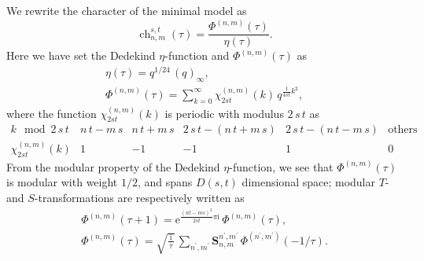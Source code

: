 \documentclass[12pt,reqno]{amsart}
\DeclareMathOperator{\ch}{ch}
\begin{document}
We rewrite the   character of the minimal model as
\begin{equation}
  \ch_{n,m}^{s,t}(\tau)
  =
  \frac{
    \Phi^{(n,m)}(\tau)
  }{\eta(\tau)} .
\end{equation}
Here
we have set the Dedekind $\eta$-function and $\Phi^{(n,m)}(\tau)$ as
\begin{gather}
  \eta(\tau)
  =
  q^{1/24} \, (q)_\infty, 
  \nonumber
  \\[2mm]
%
  \Phi^{(n,m)}(\tau)
  =
  \sum_{k=0}^\infty \chi_{2 s t}^{(n,m)}(k) \, q^{\frac{1}{4 s t} k^2} ,
  \label{define_Phi}
\end{gather}
where the function $\chi_{2 s t}^{(n,m)}(k)$ is periodic with modulus
$2\, s \, t$ as
\begin{equation}
  \begin{array}{c|ccccc}
    k
    \mod 2 \, s \, t
    & n \, t - m \, s & n \, t + m \, s &
    2 \, s \, t - ( n \, t + m \, s)
    & 2 \, s \, t - (n \, t - m \, s) &
    \text{others}
    \\
    \hline
    \chi_{2 s t}^{(n,m)}(k)
    &
    1 & -1 & -1 & 1 & 0
  \end{array}
\end{equation}
{}From the modular property of the Dedekind $\eta$-function,
we see that $\Phi^{(n,m)}(\tau)$ is modular with weight $1/2$, and
spans $D(s,t)$ dimensional space;
modular
$T$- and $S$-transformations are respectively written as
\begin{gather}
  \Phi^{(n,m)}(\tau+1)
  =
  \mathrm{e}^{\frac{(n t - m s)^2}{2 s t} \pi \mathrm{i}} \,
  \Phi^{(n,m)}(\tau) ,
  \\[2mm]
%
  \Phi^{(n,m)}(\tau)
  =
  \sqrt{\frac{\   \mathrm{i}  \  }{\tau}} \,
  \sum_{n^\prime , m^\prime}
  \mathbf{S}_{n,m}^{n^\prime , m^\prime} \,
  \Phi^{(n^\prime  ,   m^\prime)}(-1/\tau) .
  \label{Phi_S_transform}
\end{gather}
\end{document}
